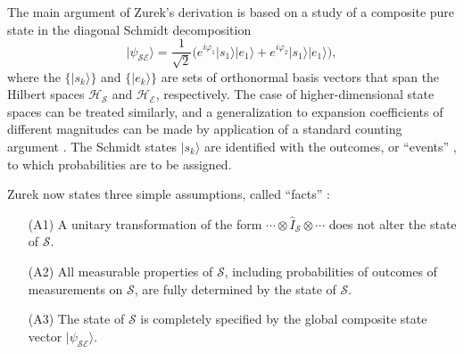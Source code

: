 \documentclass[twocolumn,rmp,aps,amsmath,amsfonts,noshowkeys,noshowpacs]{revtex4}
\newcommand{\ket}[1]{\ensuremath{|{#1\rangle}}}
\begin{document}
The main argument of Zurek's derivation is based on a study of a
composite pure state in the diagonal Schmidt decomposition
%
\begin{equation} \label{eq:schmidt}
\ket{\psi_\mathcal{SE}} = \frac{1}{\sqrt{2}} \big( e^{i\varphi_1} \ket{s_1} \ket{e_1}
+ e^{i\varphi_2} \ket{s_1} \ket{e_1} \big),
\end{equation}
%
where the $\{\ket{s_k}\}$ and $\{\ket{e_k}\}$ are sets of orthonormal
basis vectors that span the Hilbert spaces $\mathcal{H}_\mathcal{S}$
and $\mathcal{H}_\mathcal{E}$, respectively.  The case of
higher-dimensional state spaces can be treated similarly, and a
generalization to expansion coefficients of different magnitudes can be
made by application of a standard counting argument
\citep{Zurek:2003:rv,Zurek:2004:yb}.  The Schmidt states $\ket{s_k}$
are identified with the outcomes, or ``events''
\citep[][p.~12]{Zurek:2003:pl}, to which probabilities are to be
assigned.

Zurek now states three simple assumptions, called ``facts''
\citetext{\citealp{Zurek:2004:yb}, p.~4; see also the discussion in
  \citealp{Schlosshauer:2003:ms}}:

\begin{enumerate}

\item[(A1)] A unitary transformation of the form $\cdots \otimes
  \widehat{I}_\mathcal{S} \otimes \cdots$ does not alter the state of
  $\mathcal{S}$.
  
\item[(A2)] All measurable properties of $\mathcal{S}$, including
  probabilities of outcomes of measurements on $\mathcal{S}$, are
  fully determined by the state of $\mathcal{S}$.
  
\item[(A3)] The state of $\mathcal{S}$ is completely specified by the global
  composite state vector $\ket{\psi_\mathcal{SE}}$.

\end{enumerate}
\end{document}
